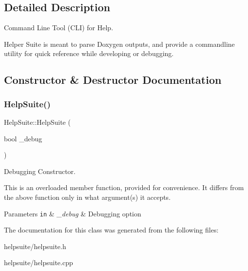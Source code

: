 \subsection{Detailed Description}
Command Line Tool (C\+LI) for Help. 

Helper Suite is meant to parse Doxygen outputs, and provide a commandline utility for quick reference while developing or debugging. 

\subsection{Constructor \& Destructor Documentation}
\mbox{\label{classHelpSuite_a63ce00b20708ab06e62f8cb0061ad47e}} 
\subsubsection{\texorpdfstring{Help\+Suite()}{HelpSuite()}}
{\footnotesize\ttfamily Help\+Suite\+::\+Help\+Suite (\begin{DoxyParamCaption}\item[{bool}]{\+\_\+debug }\end{DoxyParamCaption})}



Debugging Constructor. 

This is an overloaded member function, provided for convenience. It differs from the above function only in what argument(s) it accepts. 
\begin{DoxyParams}[1]{Parameters}
\mbox{\tt in}  & {\em \+\_\+debug} & Debugging option \\
\hline
\end{DoxyParams}


The documentation for this class was generated from the following files\+:\begin{DoxyCompactItemize}
\item 
helpsuite/helpsuite.\+h\item 
helpsuite/helpsuite.\+cpp\end{DoxyCompactItemize}
